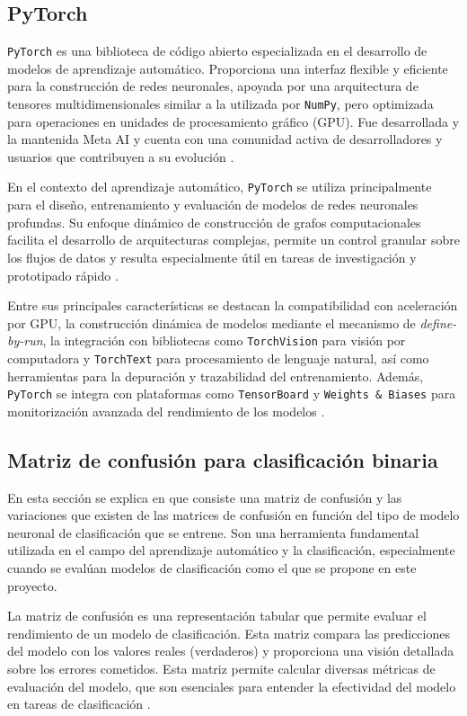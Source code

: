 \subsection{PyTorch}
\texttt{PyTorch} es una biblioteca de código abierto especializada en el desarrollo de modelos de aprendizaje automático. Proporciona una interfaz flexible y eficiente para la construcción de redes neuronales, apoyada por una arquitectura de tensores multidimensionales similar a la utilizada por \texttt{NumPy}, pero optimizada para operaciones en unidades de procesamiento gráfico (GPU). Fue desarrollada y la mantenida Meta AI y cuenta con una comunidad activa de desarrolladores y usuarios que contribuyen a su evolución \cite{paszke2019pytorch}.

En el contexto del aprendizaje automático, \texttt{PyTorch} se utiliza principalmente para el diseño, entrenamiento y evaluación de modelos de redes neuronales profundas. Su enfoque dinámico de construcción de grafos computacionales facilita el desarrollo de arquitecturas complejas, permite un control granular sobre los flujos de datos y resulta especialmente útil en tareas de investigación y prototipado rápido \cite{paszke2017automatic}.

Entre sus principales características se destacan la compatibilidad con aceleración por GPU, la construcción dinámica de modelos mediante el mecanismo de \textit{define-by-run}, la integración con bibliotecas como \texttt{TorchVision} para visión por computadora y \texttt{TorchText} para procesamiento de lenguaje natural, así como herramientas para la depuración y trazabilidad del entrenamiento. Además, \texttt{PyTorch} se integra con plataformas como \texttt{TensorBoard} y \texttt{Weights \& Biases} para monitorización avanzada del rendimiento de los modelos \cite{gross2021pytorchbook}.


\subsection{Matriz de confusión para clasificación binaria} \label{sec.matriz-consfusion}
En esta sección se explica en que consiste una matriz de confusión y las variaciones que existen de las matrices de confusión en función del tipo de modelo neuronal de clasificación que se entrene. Son una herramienta fundamental utilizada en el campo del aprendizaje automático y la clasificación, especialmente cuando se evalúan modelos de clasificación como el que se propone en este proyecto.

La matriz de confusión es una representación tabular que permite evaluar el rendimiento de un modelo de clasificación. Esta matriz compara las predicciones del modelo con los valores reales (verdaderos) y proporciona una visión detallada sobre los errores cometidos. Esta matriz permite calcular diversas métricas de evaluación del modelo, que son esenciales para entender la efectividad del modelo en tareas de clasificación \cite{han2011data}.


